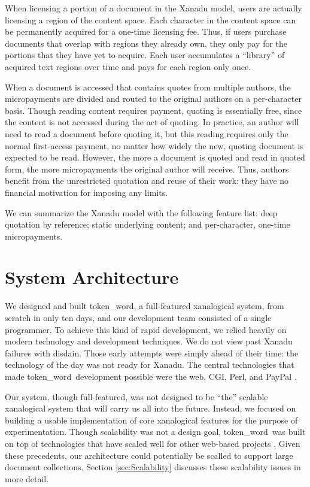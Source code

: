 \documentclass{acm_proc_article-sp}
\newcommand{\tw}{token\_word}
\begin{document}
When licensing a portion of a document in the Xanadu model, users are actually licensing a region of the content space.
Each character in the content space can be permanently acquired for a one-time licensing fee.
Thus, if users purchase documents that overlap with regions they already own, they only pay for the portions that they have yet to acquire.
Each user accumulates a ``library'' of acquired text regions over time and pays for each region only once.

When a document is accessed that contains quotes from multiple authors, the micropayments are divided and routed to the original authors on a per-character basis. 
Though reading content requires payment, quoting is essentially free, since the content is not accessed during the act of quoting.
In practice, an author will need to read a document before quoting it, but this reading requires only the normal first-access payment, no matter how widely the new, quoting document is expected to be read.
However, the more a document is quoted and read in quoted form, the more micropayments the original author will receive.
Thus, authors benefit from the unrestricted quotation and reuse of their work:  they have no financial motivation for imposing any limits.

We can summarize the Xanadu model with the following feature list:  deep quotation by reference; static underlying content; and per-character, one-time micropayments.


\section{System Architecture}
We designed and built \tw, a full-featured xanalogical system, from scratch in only ten days, and our development team consisted of a single programmer.
To achieve this kind of rapid development, we relied heavily on modern technology and development techniques.
We do not view past Xanadu failures with disdain.
Those early attempts were simply ahead of their time:  the technology of the day was not ready for Xanadu.
The central technologies that made \tw \   development possible were the web, CGI, Perl, and PayPal \cite{paypal}.

Our system, though full-featured, was not designed to be ``the'' scalable xanalogical system that will carry us all into the future.
Instead, we focused on building a usable implementation of core xanalogical features for the purpose of experimentation.
Though scalability was not a design goal, \tw \  was built on top of technologies that have scaled well for other web-based projects \cite{Everything2, WikiWikiWeb, Wikipedia}.
Given these precedents, our architecture could potentially be scalled to support large document collections.
Section \ref{sec:Scalability} discusses these scalability issues in more detail.
\end{document}
